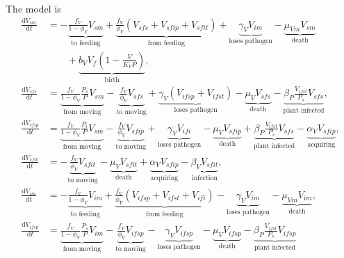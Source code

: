 \documentclass{article}
\newcommand{\md}{\mathrm{d}}
\begin{document}
The model is
\begin{equation}
  \label{odesystem}
  \begin{split}
    \frac{\md V_{sm}}{\md t}
    &=
    - \underbrace{\frac{f_V}{1 - \phi_V} V_{sm}}_{\text{to feeding}}
    + \underbrace{\frac{f_V}{\phi_V} (V_{sfs} + V_{sfip} + V_{sfit})}_{\text{from feeding}}
    + \underbrace{\gamma_V V_{im}}_{\text{loses pathogen}}
    - \underbrace{\mu_{Vm} V_{sm}}_{\text{death}}
    \\ & \quad\quad {}
    + \underbrace{b_V V_f \left(1 - \frac{V}{K_V P}\right)}_{\text{birth}},
    \\
    \frac{\md V_{sfs}}{\md t}
    &=
    \underbrace{\frac{f_V}{1 - \phi_V} \frac{P_s}{P} V_{sm}}_{\text{from moving}}
    - \underbrace{\frac{f_V}{\phi_V} V_{sfs}}_{\text{to moving}}
    + \underbrace{\gamma_V (V_{ifsp} + V_{ifst})}_{\text{loses pathogen}}
    - \underbrace{\mu_V V_{sfs}}_{\text{death}}
    - \underbrace{\beta_P \frac{V_{ifst}}{P_s} V_{sfs}}_{\text{plant
        infected}},
    \\
    \frac{\md V_{sfip}}{\md t}
    &=
    \underbrace{\frac{f_V}{1 - \phi_V} \frac{P_i}{P} V_{sm}}_{\text{from moving}}
    - \underbrace{\frac{f_V}{\phi_V} V_{sfip}}_{\text{to moving}}
    + \underbrace{\gamma_V V_{ifi}}_{\text{loses pathogen}}
    - \underbrace{\mu_V V_{sfip}}_{\text{death}}
    + \underbrace{\beta_P \frac{V_{ifst}}{P_s} V_{sfs}}_{\text{plant infected}}
    - \underbrace{\alpha_V V_{sfip}}_{\text{acquiring}},
    \\
    \frac{\md V_{sfit}}{\md t}
    &=
    - \underbrace{\frac{f_V}{\phi_V} V_{sfit}}_{\text{to moving}}
    - \underbrace{\mu_V V_{sfit}}_{\text{death}}
    + \underbrace{\alpha_V V_{sfip}}_{\text{acquiring}}
    - \underbrace{\beta_V V_{sfit}}_{\text{infection}},
    \\
    \frac{\md V_{im}}{\md t}
    &=
    - \underbrace{\frac{f_V}{1 - \phi_V} V_{im}}_{\text{to feeding}}
    + \underbrace{\frac{f_V}{\phi_V} (V_{ifsp} + V_{ifst} + V_{ifi})}_{\text{from feeding}}
    - \underbrace{\gamma_V V_{im}}_{\text{loses pathogen}}
    - \underbrace{\mu_{Vm} V_{im}}_{\text{death}},
    \\
    \frac{\md V_{ifsp}}{\md t}
    &=
    \underbrace{\frac{f_V}{1 - \phi_V} \frac{P_s}{P} V_{im}}_{\text{from moving}}
    - \underbrace{\frac{f_V}{\phi_V} V_{ifsp}}_{\text{to moving}}
    - \underbrace{\gamma_V V_{ifsp}}_{\text{loses pathogen}}
    - \underbrace{\mu_V V_{ifsp}}_{\text{death}}
    - \underbrace{\beta_P \frac{V_{ifst}}{P_s} V_{ifsp}}_{\text{plant infected}}

\end{split}
\end{equation}
\end{document}
